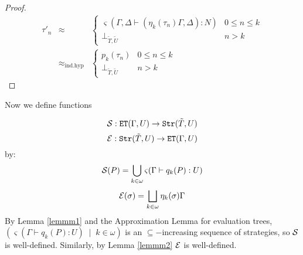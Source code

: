 \documentclass[11pt]{article}
\begin{document}
\begin{proof}
\[\begin{array}{lll}
\tau'_n & \approx& \left\{ \begin{array}{cc}
 \varsigma(\Gamma,\Delta\vdash (\eta_k(\tau_n)\Gamma,\Delta):N ) &
 0\leq n\leq k \\
 \bot_{\tilde{T},\tilde{U}} & n>k
             \end{array} \right.  \\
  &\approx_{\mbox{ind.hyp}}& \left\{ \begin{array}{cc}
p_k(\tau_n) & 0\leq n\leq k \\
\bot_{\tilde{T},\tilde{U}} & n>k
    \end{array} \right.
\end{array} \]
\end{proof}

Now we define functions

$${\cal S} :{\tt ET}(\Gamma,U)\rightarrow {\tt Str}(\tilde{T},U)$$
$${\cal E} : {\tt Str} (\tilde{T},U)\rightarrow {\tt ET}(\Gamma,U)$$
by:
$${\cal S}(P) =\bigcup_{k\in\omega} \varsigma(\Gamma\vdash q_k(P):U)$$
$${\cal E}(\sigma) =\bigsqcup_{k\in\omega}\eta_k(\sigma)\Gamma$$
By Lemma \ref{lemmm1} and the Approximation Lemma for evaluation trees,
$(\varsigma(\Gamma\vdash q_k(P):U)\;\mid \; k\in\omega)$ is an
$\subseteq-$increasing sequence of strategies, so ${\cal S}$ is
well-defined. Similarly, by Lemma \ref{lemmm2} $\cal E$ is well-defined.
\end{document}
